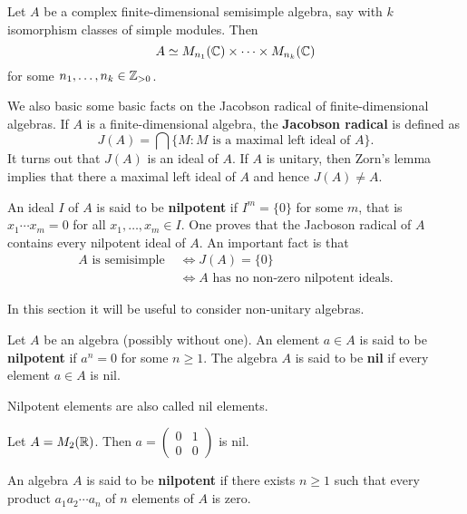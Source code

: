\begin{theorem}
Let $A$ be a complex finite-dimensional semisimple algebra, say with  
$k$ isomorphism classes of simple modules. Then 
\[
A\simeq M_{n_1}(\mathbb{C})\times\cdots\times M_{n_k}(\mathbb{C})
\]
for some $n_1,\dots,n_k\in\mathbb{Z}_{>0}$.
\end{theorem}

We also basic some basic facts on the Jacobson radical
of finite-dimensional algebras. If $A$ is a finite-dimensional algebra, the \textbf{Jacobson radical} is defined as 
\[
J(A)=\bigcap\{M:M\text{ is a maximal left ideal of $A$}\}. 
\]
It turns out that $J(A)$ is an ideal of $A$. If $A$ is
unitary, then Zorn's lemma implies that there a 
maximal left ideal of $A$ and hence $J(A)\ne A$. 

An ideal $I$ of $A$ is said to be \textbf{nilpotent}
if $I^m=\{0\}$ for some $m$, that is 
$x_1\cdots x_m=0$ for all $x_1,\dots,x_m\in I$. 
One proves that the Jacboson radical of $A$ 
contains every nilpotent ideal of $A$. An important
fact is that 
\begin{align*}
A\text{ is semisimple }
&\Longleftrightarrow 
J(A)=\{0\}\\
&\Longleftrightarrow 
A\text{ has no non-zero nilpotent ideals}.
\end{align*}

\label{Kolchin}

In this section it will be useful to consider 
non-unitary algebras. 

\begin{definition}
    Let $A$ be an algebra (possibly without one). An element $a\in A$
    is said to be \textbf{nilpotent} if 
    $a^n=0$ for some $n\geq1$. The algebra $A$ is said to be
    \textbf{nil} if every element $a\in A$ is nil. 
\end{definition}

Nilpotent elements are also called nil elements.  

\begin{example}
    Let $A=M_2(\mathbb{R})$. Then $a=\begin{pmatrix}0&1\\0&0\end{pmatrix}$ is nil. 
\end{example}

\begin{definition}
    An algebra $A$ is said to be \textbf{nilpotent} if there exists
    $n\geq1$ such that every product 
    $a_1a_2\cdots a_n$
    of $n$ elements of $A$ is zero. 
\end{definition}

